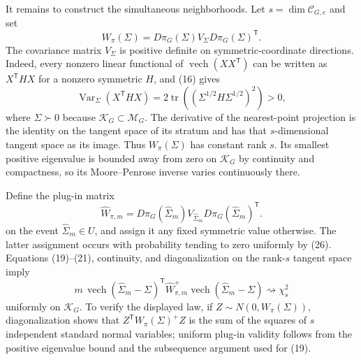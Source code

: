It remains to construct the simultaneous neighborhoods.  Let \(s=\dim\mathcal C_{G,e}\) and set
\[
 W_\pi(\Sigma)=D\pi_G(\Sigma)V_\Sigma D\pi_G(\Sigma)^{\mathsf T}.
\tag{30}
\]
The covariance matrix \(V_\Sigma\) is positive definite on symmetric-coordinate directions.  Indeed, every nonzero linear functional of \(\operatorname{vech}(XX^{\mathsf T})\) can be written as \(X^{\mathsf T}HX\) for a nonzero symmetric \(H\), and (16) gives
\[
 \operatorname{Var}_\Sigma(X^{\mathsf T}HX)
 =2\operatorname{tr}\!\left((\Sigma^{1/2}H\Sigma^{1/2})^2\right)>0,
\tag{31}
\]
where \(\Sigma\succ0\) because \(\mathcal K_G\subset\mathcal M_G\).  The derivative of the nearest-point projection is the identity on the tangent space of its stratum and has that \(s\)-dimensional tangent space as its image.  Thus \(W_\pi(\Sigma)\) has constant rank \(s\).  Its smallest positive eigenvalue is bounded away from zero on \(\mathcal K_G\) by continuity and compactness, so its Moore--Penrose inverse varies continuously there.

Define the plug-in matrix
\[
 \widehat W_{\pi,m}
 =D\pi_G(\widehat\Sigma_m)V_{\widehat\Sigma_m}
  D\pi_G(\widehat\Sigma_m)^{\mathsf T}.
\]
on the event \(\widehat\Sigma_m\in U\), and assign it any fixed symmetric value otherwise.  The latter assignment occurs with probability tending to zero uniformly by (26).
Equations (19)--(21), continuity, and diagonalization on the rank-\(s\) tangent space imply
\[
 m\,\operatorname{vech}(\widehat\Sigma_m-\Sigma)^{\mathsf T}
 \widehat W_{\pi,m}^{+}
 \operatorname{vech}(\widehat\Sigma_m-\Sigma)
 \rightsquigarrow\chi_s^2
\tag{32}
\]
uniformly on \(\mathcal K_G\).  To verify the displayed law, if \(Z\sim N(0,W_\pi(\Sigma))\), diagonalization shows that \(Z^{\mathsf T}W_\pi(\Sigma)^+Z\) is the sum of the squares of \(s\) independent standard normal variables; uniform plug-in validity follows from the positive eigenvalue bound and the subsequence argument used for (19).

